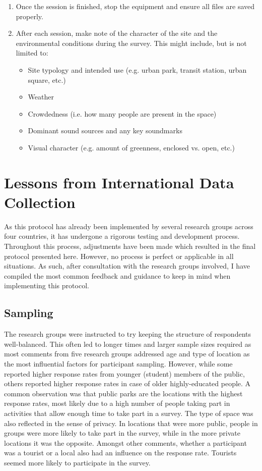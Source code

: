 \begin{enumerate}
     \item Once the session is finished, stop the equipment and ensure all files are saved properly.
     \item After each session, make note of the character of the site and the environmental conditions during the survey. This might include, but is not limited to:
           \begin{itemize}
             \item Site typology and intended use (e.g. urban park, transit station, urban square, etc.)
             \item Weather
             \item Crowdedness (i.e. how many people are present in the space)
             \item Dominant sound sources and any key soundmarks
             \item Visual character (e.g. amount of greenness, enclosed vs. open, etc.)
           \end{itemize}
   \end{enumerate}

\section{Lessons from International Data Collection}

 As this protocol has already been implemented by several research groups across four countries, it has undergone a rigorous testing and development process. Throughout this process, adjustments have been made which resulted in the final protocol presented here. However, no process is perfect or applicable in all situations. As such, after consultation with the research groups involved, I have compiled the most common feedback and guidance to keep in mind when implementing this protocol.

 \subsection{Sampling}

   The research groups were instructed to try keeping the structure of respondents well-balanced. This often led to longer times and larger sample sizes required as most comments from five research groups addressed age and type of location as the most influential factors for participant sampling. However, while some reported higher response rates from younger (student) members of the public, others reported higher response rates in case of older highly-educated people. A common observation was that public parks are the locations with the highest response rates, most likely due to a high number of people taking part in activities that allow enough time to take part in a survey. The type of space was also reflected in the sense of privacy. In locations that were more public, people in groups were more likely to take part in the survey, while in the more private locations it was the opposite. Amongst other comments, whether a participant was a tourist or a local also had an influence on the response rate. Tourists seemed more likely to participate in the survey.

